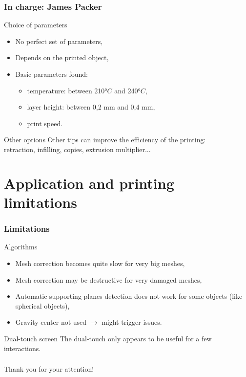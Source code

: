 \documentclass{beamer}
\begin{document}
\begin{frame}
	\frametitle{In charge: James Packer}

	\begin{block}{Choice of parameters}
	\begin{itemize}
	\item No perfect set of parameters,
	\item Depends on the printed object,
	\item Basic parameters found:
		\begin{itemize}
		\item temperature: between 210$°C$ and 240$°C$,
		\item layer height: between 0,2 mm  and 0,4 mm,
		\item print speed.
		\end{itemize}
	\end{itemize}	
    \end{block}
    
    \begin{block}{Other options}
    Other tips can improve the efficiency of the printing:	\\
    retraction, infilling, copies, extrusion multiplier...
    \end{block}
\end{frame}

\section{Application and printing limitations}
\begin{frame}
	\frametitle{Limitations}
	
	\begin{block}{Algorithms}
    \begin{itemize}
    \item Mesh correction becomes quite slow for very big meshes,
    \item Mesh correction may be destructive for very damaged meshes,
    \item Automatic supporting planes detection does not work for some objects (like spherical objects),
    \item Gravity center not used $\rightarrow$ might trigger issues.
    \end{itemize}
    \end{block}
    
    \begin{block}{Dual-touch screen}
    The dual-touch only appears to be useful for a few interactions.
    \end{block}
\end{frame}

\begin{frame}
	\frametitle{}

    \begin{center}
    \Large{Thank you for your attention!}
    \end{center}
\end{frame}
	
\end{document}
